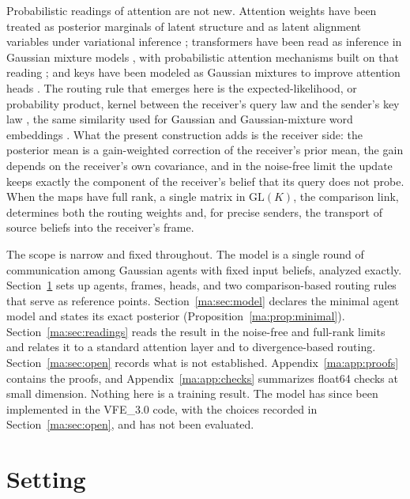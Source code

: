 \documentclass[11pt]{article}
\theoremstyle{definition}
\theoremstyle{remark}
\providecommand{\GL}{\mathrm{GL}}
\begin{document}
Probabilistic readings of attention are not new. Attention weights have been treated as posterior marginals of latent structure \citep{Kim2017StructuredAttention} and as latent alignment variables under variational inference \citep{Deng2018LatentAlignment}; transformers have been read as inference in Gaussian mixture models \citep{Movellan2020ProbabilisticTransformers}, with probabilistic attention mechanisms built on that reading \citep{Gabbur2021ProbabilisticAttention}; and keys have been modeled as Gaussian mixtures to improve attention heads \citep{Nguyen2022MGK}. The routing rule that emerges here is the expected-likelihood, or probability product, kernel between the receiver's query law and the sender's key law \citep{Jebara2004ProbabilityProduct}, the same similarity used for Gaussian and Gaussian-mixture word embeddings \citep{Vilnis2015Gaussian,Athiwaratkun2017Multimodal}. What the present construction adds is the receiver side: the posterior mean is a gain-weighted correction of the receiver's prior mean, the gain depends on the receiver's own covariance, and in the noise-free limit the update keeps exactly the component of the receiver's belief that its query does not probe. When the maps have full rank, a single matrix in $\GL(K)$, the comparison link, determines both the routing weights and, for precise senders, the transport of source beliefs into the receiver's frame.

The scope is narrow and fixed throughout. The model is a single round of communication among Gaussian agents with fixed input beliefs, analyzed exactly. Section~\ref{ma:sec:setting} sets up agents, frames, heads, and two comparison-based routing rules that serve as reference points. Section~\ref{ma:sec:model} declares the minimal agent model and states its exact posterior (Proposition~\ref{ma:prop:minimal}). Section~\ref{ma:sec:readings} reads the result in the noise-free and full-rank limits and relates it to a standard attention layer and to divergence-based routing. Section~\ref{ma:sec:open} records what is not established. Appendix~\ref{ma:app:proofs} contains the proofs, and Appendix~\ref{ma:app:checks} summarizes float64 checks at small dimension. Nothing here is a training result. The model has since been implemented in the VFE\_3.0 code, with the choices recorded in Section~\ref{ma:sec:open}, and has not been evaluated.

\section{Setting}
\label{ma:sec:setting}
\end{document}
